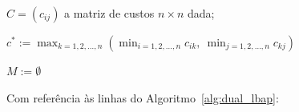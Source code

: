 \begin{algorithm}[H]
    \DontPrintSemicolon
    \SetAlgoLined

    \KwLet $C = (c_{ij})$ a matriz de custos $n \times n$ dada;\label{dlb:let}\;
    
    $c^* := \max_{k=1,2,\dots,n} (\min_{i=1,2,\dots,n} c_{ik}, \ \min_{j=1,2,\dots,n} c_{kj})$\label{dlb:bound}\;
    
    $M := \emptyset$\label{dlb:empty}\;

    
    \caption{Dual\_LBAP: algoritmo dual para o LBAP \cite{burkard}}
    \label{alg:dual_lbap}
\end{algorithm}

Com referência às linhas do Algoritmo~\ref{alg:dual_lbap}:

